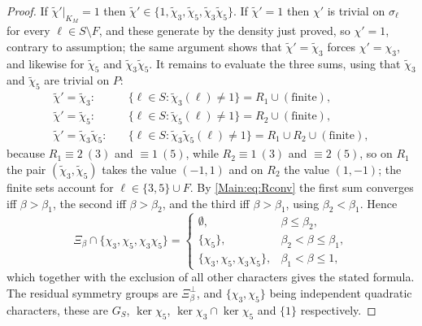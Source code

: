 \begin{proof}
If $\tilde\chi'|_{K_M}=1$ then $\tilde\chi'\in\{1,\tilde\chi_3,\tilde\chi_5,\tilde\chi_3\tilde\chi_5\}$.
If $\tilde\chi'=1$ then $\chi'$ is trivial on $\sigma_\ell$ for every
$\ell\in S\setminus F$, and these generate by the density just proved, so
$\chi'=1$, contrary to assumption; the same argument shows that
$\tilde\chi'=\tilde\chi_3$ forces $\chi'=\chi_3$, and likewise for
$\tilde\chi_5$ and $\tilde\chi_3\tilde\chi_5$. It remains to evaluate the three
sums, using that $\tilde\chi_3$ and $\tilde\chi_5$ are trivial on $P$:
\[
\begin{aligned}
\tilde\chi'=\tilde\chi_3:\quad&\{\ell\in S:\tilde\chi_3(\ell)\neq1\}=R_1\cup(\text{finite}),\\
\tilde\chi'=\tilde\chi_5:\quad&\{\ell\in S:\tilde\chi_5(\ell)\neq1\}=R_2\cup(\text{finite}),\\
\tilde\chi'=\tilde\chi_3\tilde\chi_5:\quad&\{\ell\in S:\tilde\chi_3\tilde\chi_5(\ell)\neq1\}=R_1\cup R_2\cup(\text{finite}),
\end{aligned}
\]
because $R_1\equiv2\ (3)$ and $\equiv1\ (5)$, while $R_2\equiv1\ (3)$ and
$\equiv2\ (5)$, so on $R_1$ the pair $(\tilde\chi_3,\tilde\chi_5)$ takes the
value $(-1,1)$ and on $R_2$ the value $(1,-1)$; the finite sets account for
$\ell\in\{3,5\}\cup F$. By \eqref{Main:eq:Rconv} the first sum converges iff
$\beta>\beta_1$, the second iff $\beta>\beta_2$, and the third iff
$\beta>\beta_1$, using $\beta_2<\beta_1$. Hence
\[
\Xi_\beta\cap\{\chi_3,\chi_5,\chi_3\chi_5\}=
\begin{cases}
\emptyset,&\beta\le\beta_2,\\
\{\chi_5\},&\beta_2<\beta\le\beta_1,\\
\{\chi_3,\chi_5,\chi_3\chi_5\},&\beta_1<\beta\le1,
\end{cases}
\]
which together with the exclusion of all other characters gives the stated
formula. The residual symmetry groups are $\Xi_\beta^\perp$, and
$\{\chi_3,\chi_5\}$ being independent quadratic characters, these are
$G_S$, $\ker\chi_5$, $\ker\chi_3\cap\ker\chi_5$ and $\{1\}$ respectively.
\end{proof}

